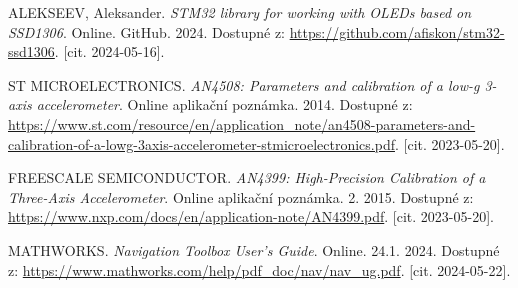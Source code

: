 \begin{thebibliography}{99}
ALEKSEEV, Aleksander. \textit{STM32 library for working with OLEDs based on SSD1306}. Online. GitHub. 2024. Dostupné z: \url{https://github.com/afiskon/stm32-ssd1306}. [cit. 2024-05-16].


ST MICROELECTRONICS. \textit{AN4508: Parameters and calibration of a low-g 3-axis accelerometer}. Online aplikační poznámka. 2014. Dostupné z: \url{https://www.st.com/resource/en/application\_note/an4508-parameters-and-calibration-of-a-lowg-3axis-accelerometer-stmicroelectronics.pdf}. [cit. 2023-05-20].


FREESCALE SEMICONDUCTOR. \textit{AN4399: High-Precision Calibration of a Three-Axis Accelerometer}. Online aplikační poznámka. 2. 2015. Dostupné z: \url{https://www.nxp.com/docs/en/application-note/AN4399.pdf}. [cit. 2023-05-20].

MATHWORKS. \textit{Navigation Toolbox User's Guide}. Online. 24.1. 2024. Dostupné z: \url{https://www.mathworks.com/help/pdf\_doc/nav/nav\_ug.pdf}. [cit. 2024-05-22].

\end{thebibliography}